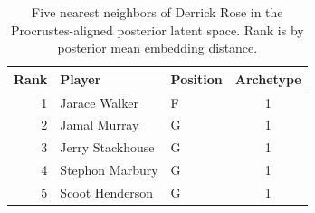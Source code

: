 \begin{table}[htbp]
  \centering\small
  \begin{tabular}{rllc}
    \toprule
    Rank & Player & Position & Archetype \\
    \midrule
    1 & Jarace Walker & F & 1 \\
    2 & Jamal Murray & G & 1 \\
    3 & Jerry Stackhouse & G & 1 \\
    4 & Stephon Marbury & G & 1 \\
    5 & Scoot Henderson & G & 1 \\
    \bottomrule
  \end{tabular}
  \caption{Five nearest neighbors of Derrick Rose in the Procrustes-aligned posterior latent space. Rank is by posterior mean embedding distance.}
  \label{tab:Derrick_Rose_neighbors}
\end{table}

